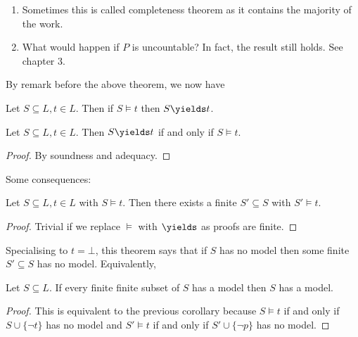 \documentclass[a4paper]{article}
\begin{document}
\begin{remark}\leavevmode
  \begin{enumerate}
  \item Sometimes this is called completeness theorem as it contains the majority of the work.
  \item What would happen if \(P\) is uncountable? In fact, the result still holds. See chapter 3.
  \end{enumerate}
\end{remark}

By remark before the above theorem, we now have

\begin{corollary}[Adequacy]
  Let \(S \subseteq L, t \in L\). Then if \(S \models t\) then \(S \yields t\).
\end{corollary}

\begin{theorem}
  Let \(S \subseteq L, t \in L\). Then \(S \yields t\) if and only if \(S \models t\).
\end{theorem}

\begin{proof}
  By soundness and adequacy.
\end{proof}

Some consequences:

\begin{corollary}
  Let \(S \subseteq L, t \in L\) with \(S \models t\). Then there exists a finite \(S' \subseteq S\) with \(S' \models t\).
\end{corollary}

\begin{proof}
  Trivial if we replace \(\models\) with \(\yields\) as proofs are finite.
\end{proof}

Specialising to \(t = \bot\), this theorem says that if \(S\) has no model then some finite \(S' \subseteq S\) has no model. Equivalently,

\begin{corollary}
  Let \(S \subseteq L\). If every finite finite subset of \(S\) has a model then \(S\) has a model.
\end{corollary}

\begin{proof}
  This is equivalent to the previous corollary because \(S \models t\) if and only if \(S \cup \{\neg t\}\) has no model and \(S' \models t\) if and only if \(S' \cup \{\neg p\}\) has no model.
\end{proof}
\end{document}
